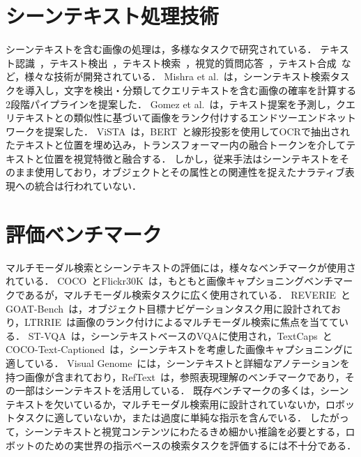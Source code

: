 \section{シーンテキスト処理技術}
シーンテキストを含む画像の処理は，多様なタスクで研究されている．
テキスト認識~\cite{Zhao2023MultimodalIL, OTE}，テキスト検出~\cite{Liang_2024_CVPR, STEP, Zheng_2024_CVPR}，テキスト検索~\cite{Zeng2024FocusDA, Zheng_2024_CVPR, vista}，視覚的質問応答~\cite{Biten2021LaTrLT, stvqa, Gao2020MultiModalGN}，テキスト合成~\cite{Cui_2024_CVPR, Duan2024ODMAT, Santoso2023OnMS}など，様々な技術が開発されている．
Mishra et al.~\cite{ocrvqa}は，シーンテキスト検索タスクを導入し，文字を検出・分類してクエリテキストを含む画像の確率を計算する2段階パイプラインを提案した．
Gomez et al.~\cite{GomezMaflaECCV2018single}は，テキスト提案を予測し，クエリテキストとの類似性に基づいて画像をランク付けするエンドツーエンドネットワークを提案した．
ViSTA~\cite{vista}は，BERT~\cite{Devlin2019BERTPO}と線形投影を使用してOCRで抽出されたテキストと位置を埋め込み，トランスフォーマー内の融合トークンを介してテキストと位置を視覚特徴と融合する．
しかし，従来手法はシーンテキストをそのまま使用しており，オブジェクトとその属性との関連性を捉えたナラティブ表現への統合は行われていない．

\section{評価ベンチマーク}
マルチモーダル検索とシーンテキストの評価には，様々なベンチマークが使用されている．
COCO~\cite{Lin2014MicrosoftCC}とFlickr30K~\cite{flickr30k}は，もともと画像キャプショニングベンチマークであるが，マルチモーダル検索タスクに広く使用されている．
REVERIE~\cite{qi2020reverie}とGOAT-Bench~\cite{khanna2024goatbench}は，オブジェクト目標ナビゲーションタスク用に設計されており，LTRRIE~\cite{multirankit}は画像のランク付けによるマルチモーダル検索に焦点を当てている．
ST-VQA~\cite{stvqa}は，シーンテキストベースのVQAに使用され，TextCaps~\cite{textcaps}とCOCO-Text-Captioned~\cite{stacmr}は，シーンテキストを考慮した画像キャプショニングに適している．
Visual Genome~\cite{Krishna2017}には，シーンテキストと詳細なアノテーションを持つ画像が含まれており，RefText~\cite{stan}は，参照表現理解のベンチマークであり，その一部はシーンテキストを活用している．
既存ベンチマークの多くは，シーンテキストを欠いているか，マルチモーダル検索用に設計されていないか，ロボットタスクに適していないか，または過度に単純な指示を含んでいる．
したがって，シーンテキストと視覚コンテンツにわたるきめ細かい推論を必要とする，ロボットのための実世界の指示ベースの検索タスクを評価するには不十分である．

